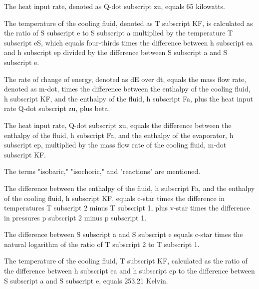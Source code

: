 The heat input rate, denoted as Q-dot subscript zu, equals 65 kilowatts.

The temperature of the cooling fluid, denoted as T subscript KF, is calculated as the ratio of S subscript e to S subscript a multiplied by the temperature T subscript eS, which equals four-thirds times the difference between h subscript ea and h subscript ep divided by the difference between S subscript a and S subscript e.

The rate of change of energy, denoted as dE over dt, equals the mass flow rate, denoted as m-dot, times the difference between the enthalpy of the cooling fluid, h subscript KF, and the enthalpy of the fluid, h subscript Fa, plus the heat input rate Q-dot subscript zu, plus beta.

The heat input rate, Q-dot subscript zu, equals the difference between the enthalpy of the fluid, h subscript Fa, and the enthalpy of the evaporator, h subscript ep, multiplied by the mass flow rate of the cooling fluid, m-dot subscript KF.

The terms "isobaric," "isochoric," and "reactions" are mentioned.

The difference between the enthalpy of the fluid, h subscript Fa, and the enthalpy of the cooling fluid, h subscript KF, equals c-star times the difference in temperatures T subscript 2 minus T subscript 1, plus v-star times the difference in pressures p subscript 2 minus p subscript 1.

The difference between S subscript a and S subscript e equals c-star times the natural logarithm of the ratio of T subscript 2 to T subscript 1.

The temperature of the cooling fluid, T subscript KF, calculated as the ratio of the difference between h subscript ea and h subscript ep to the difference between S subscript a and S subscript e, equals 253.21 Kelvin.